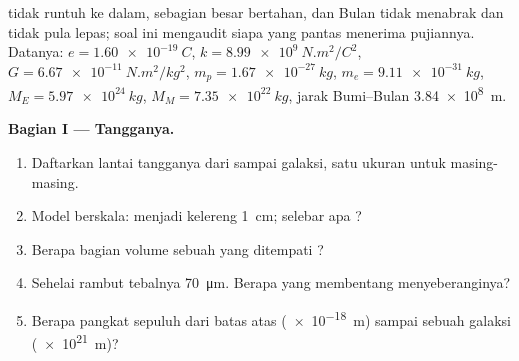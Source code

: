 \begin{problem}
\label{pb:g11:fundamental-interactions:1}
 tidak runtuh ke dalam,  sebagian besar bertahan, dan
Bulan tidak menabrak dan tidak pula lepas; soal ini mengaudit siapa
yang pantas menerima pujiannya. Datanya:
$e = \qty{1.60e-19}{C}$,
$k = \qty{8.99e9}{N.m^2/C^2}$, $G = \qty{6.67e-11}{N.m^2/kg^2}$,
$m_p = \qty{1.67e-27}{kg}$, $m_e = \qty{9.11e-31}{kg}$,
$M_E = \qty{5.97e24}{kg}$, $M_M = \qty{7.35e22}{kg}$, jarak
Bumi--Bulan \qty{3.84e8}{m}.

\medskip
\noindent\textbf{Bagian I --- Tangganya.}
\begin{enumerate}
  \item Daftarkan lantai tangganya dari  sampai galaksi, satu  ukuran untuk masing-masing.
  \item Model berskala:  menjadi kelereng \qty{1}{cm};
        selebar apa ?
  \item Berapa bagian volume sebuah  yang ditempati ?
  \item Sehelai rambut tebalnya \qty{70}{\micro m}. Berapa  yang
        membentang menyeberanginya?
  \item Berapa pangkat sepuluh dari batas atas  (\qty{e-18}{m})
        sampai sebuah galaksi (\qty{e21}{m})?
\end{enumerate}


\end{problem}
